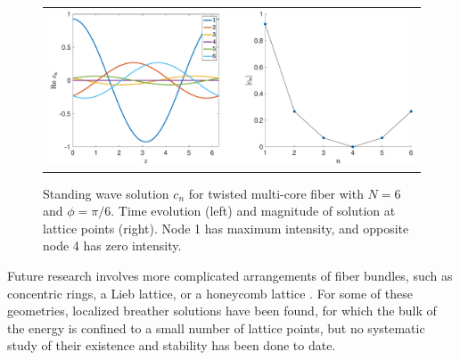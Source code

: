 \documentclass[12pt,reqno,oneside]{article}
\theoremstyle{definition}
\theoremstyle{remark}
\begin{document}
\begin{figure}[H]
\begin{center}
\begin{tabular}{c}
\includegraphics[width=14cm]{images/evenhole6}
\end{tabular}
\end{center}
\caption{Standing wave solution $c_n$ for twisted multi-core fiber with $N = 6$ and $\phi = \pi/6$. Time evolution (left) and magnitude of solution at lattice points (right). Node 1 has maximum intensity, and opposite node 4 has zero intensity.}
\label{fig:twistcn}
\end{figure}
Future research involves more complicated arrangements of fiber bundles, such as concentric rings, a Lieb lattice, or a honeycomb lattice \cite{Lumer2013,Marzuola2019}. For some of these geometries, localized breather solutions have been found, for which the bulk of the energy is confined to a small number of lattice points, but no systematic study of their existence and stability has been done to date.


\footnotesize{  }
\end{document}
